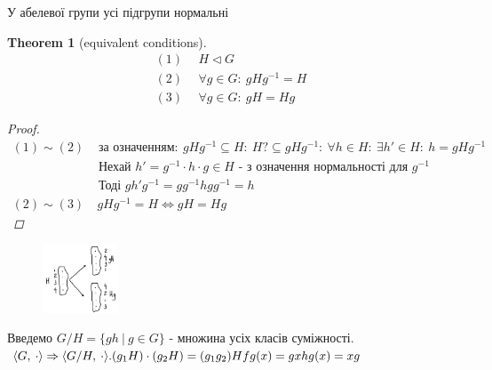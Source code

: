 \documentclass[a4paper,12pt, centered]{bookest}
\newtheorem{theorem}{Theorem}[section]
\begin{document}
У абелевої групи усі підгрупи нормальні 
\begin{theorem}[equivalent conditions]
	\begin{align*}
		(1)\>\>& H\triangleleft G\\
		(2)\>\>& \forall g\in G:\>gHg^{-1}=H\\
		(3)\>\>& \forall g\in G:\>gH=Hg
	\end{align*}
	\begin{proof}
		\begin{align*}
			(1)\sim(2)&\textrm{ за означенням} :\>gHg^{-1}\subseteq H:\>H?\subseteq gHg^{-1}:\>\forall h\in H:\>\exists h'\in H:\>h=gHg^{-1}\\&\textrm{ Нехай } h'=g^{-1}\cdot h\cdot g\in H\textrm{ - з означення нормальності для } g^{-1}\\&\textrm{ Тоді } gh'g^{-1}=gg^{-1}hgg^{-1}=h\\(2)\sim(3)&\>gHg^{-1}=H\Leftrightarrow gH=Hg
		\end{align*}
	\end{proof}
\end{theorem}
\begin{figure}
  \begin{center}
    \includegraphics[width=0.2\textwidth]{graph5}
  \end{center}
\end{figure}
Введемо $G/ H=\{gh\>|\>g\in G\}$ - множина усіх класів суміжності.$\langle G,\>\cdot\rangle\Rightarrow\langle G/H,\>\cdot\rangle.\\(g_1H)\cdot(g_2H)=(g_1g_2)H\\fg(x)=gx\\hg(x)=xg$ \newblock
\end{document}
